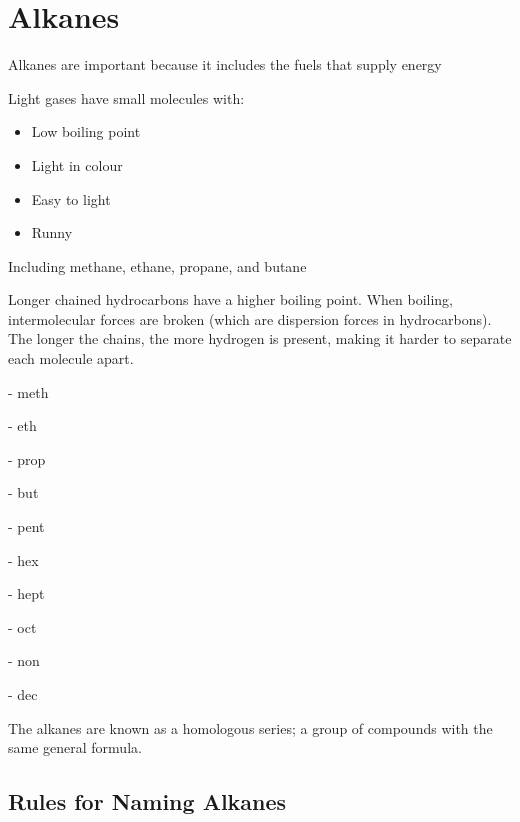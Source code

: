 \section{Alkanes}

	Alkanes are important because it includes the fuels that supply energy

	Light gases have small molecules with:

	\begin{itemize}
		\item Low boiling point
		\item Light in colour
		\item Easy to light
		\item Runny
	\end{itemize}

	Including methane, ethane, propane, and butane

	Longer chained hydrocarbons have a higher boiling point. When boiling, intermolecular forces are broken (which are dispersion forces in hydrocarbons). The longer the chains, the more hydrogen is present, making it harder to separate each molecule apart.

		 - meth

		 - eth

		 - prop

		 - but

		 - pent

		 - hex

		 - hept
		
		 - oct
		
		 - non

		 - dec

	The alkanes are known as a homologous series; a group of compounds with the same general formula.
	
	\subsection{Rules for Naming Alkanes}
	
